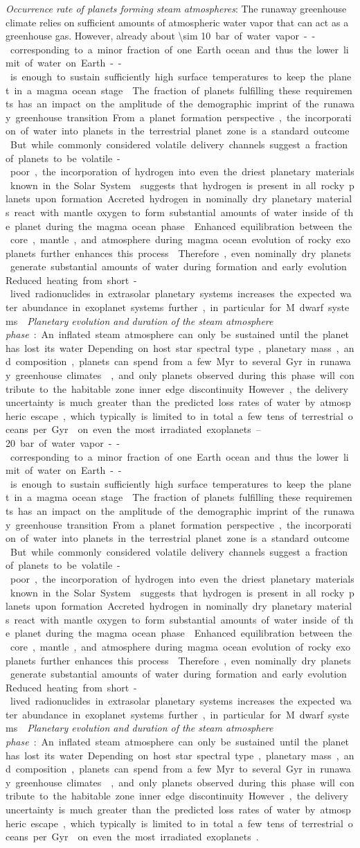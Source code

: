 \documentclass[twocolumn,twocolappendix]{aastex631}
\begin{document}
\textit{Occurrence rate of planets forming steam atmospheres}: The runaway greenhouse climate relies on sufficient amounts of atmospheric water vapor that can act as a greenhouse gas.
However, already about \SIrange{\sim 10}{20}~bar of water vapor -- corresponding to a minor fraction of one Earth ocean and thus the lower limit of water on Earth -- is enough to sustain sufficiently high surface temperatures to keep the planet in a magma ocean stage~\citep{Boukrouche2021,Lichtenberg2021c}.
The fraction of planets fulfilling these requirements has an impact on the amplitude of the demographic imprint of the runaway greenhouse transition.
From a planet formation perspective, the incorporation of water into planets in the terrestrial planet zone is a standard outcome~\citep{2019PNAS..116.9723Z,Venturini2020}.
But while commonly considered volatile delivery channels suggest a fraction of planets to be volatile-poor, the incorporation of hydrogen into even the driest planetary materials known in the Solar System~\citep{2020Sci...369.1110P,2021PSJ.....2..244J} suggests that hydrogen is present in all rocky planets upon formation.
Accreted hydrogen in nominally dry planetary materials react with mantle oxygen to form substantial amounts of water inside of the planet during the magma ocean phase~\citep{Ikoma2018,2021ApJ...909L..22K,2020MNRAS.496.3755K,2022NatAs...6.1296K}.
Enhanced equilibration between the core, mantle, and atmosphere during magma ocean evolution of rocky exoplanets further enhances this process~\citep{2021ApJ...914L...4L,Schlichting2022}.
Therefore, even nominally dry planets generate substantial amounts of water during formation and early evolution.
Reduced heating from short-lived radionuclides in extrasolar planetary systems increases the expected water abundance in exoplanet systems further, in particular for M~dwarf systems~\citep{2022ApJ...938L...3L}.

\textit{Planetary evolution and duration of the steam atmosphere phase}: An inflated steam atmosphere can only be sustained until the planet has lost its water.
Depending on host star spectral type, planetary mass, and composition, planets can spend from a few Myr to several Gyr in runaway greenhouse climates~\citep[][]{Hamano2015,Luger2015}, and only planets observed during this phase will contribute to the habitable zone inner edge discontinuity.
However, the delivery uncertainty is much greater than the predicted loss rates of water by atmospheric escape, which typically is limited to in total a few tens of terrestrial oceans per Gyr~\citep{2018AJ....155..195W} on even the most irradiated exoplanets~\citep[see discussion in][]{2022ApJ...938L...3L}.
\end{document}
